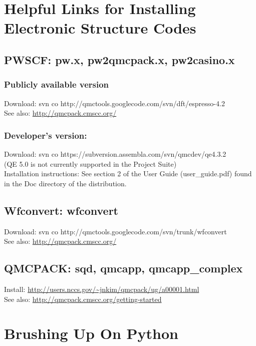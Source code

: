 \documentclass[oneside,11pt]{memoir}
\numberwithin{equation}{section}
\begin{document}
\section{Helpful Links for Installing Electronic Structure Codes} \label{install_code}
\subsection{PWSCF: pw.x, pw2qmcpack.x, pw2casino.x}
  \subsubsection{Publicly available version}
  Download: svn co http://qmctools.googlecode.com/svn/dft/espresso-4.2 \\
  See also: \url{http://qmcpack.cmscc.org/}\\
  \subsubsection{Developer's version:} 
  Download: svn co https://subversion.assembla.com/svn/qmcdev/qe4.3.2 \\
  (QE 5.0 is not currently supported in the Project Suite)\\
  Installation instructions: See section 2 of the User Guide (user\_guide.pdf) 
  found in the Doc directory of the distribution.

\subsection{Wfconvert: wfconvert}
  Download: svn co http://qmctools.googlecode.com/svn/trunk/wfconvert \\
  See also: \url{http://qmcpack.cmscc.org/}
\subsection{QMCPACK: sqd, qmcapp, qmcapp\_complex}
  Install: \url{http://users.nccs.gov/~jnkim/qmcpack/ug/a00001.html}\\
  See also: \url{http://qmcpack.cmscc.org/getting-started}


\section{Brushing Up On Python}\label{learn_python}
\end{document}

